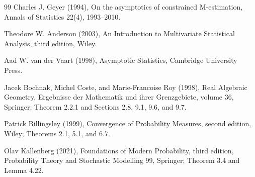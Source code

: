 \documentclass{article}
\begin{document}
\begin{thebibliography}{99}
   Charles J. Geyer (1994), On the asymptotics of constrained M-estimation, Annals of Statistics 22(4), 1993--2010.

   Theodore W. Anderson (2003), An Introduction to Multivariate Statistical Analysis, third edition, Wiley.

   Aad W. van der Vaart (1998), Asymptotic Statistics, Cambridge University Press.

   Jacek Bochnak, Michel Coste, and Marie-Francoise Roy (1998), Real Algebraic Geometry, Ergebnisse der Mathematik und ihrer Grenzgebiete, volume 36, Springer; Theorem 2.2.1 and Sections 2.8, 9.1, 9.6, and 9.7.

   Patrick Billingsley (1999), Convergence of Probability Measures, second edition, Wiley; Theorems 2.1, 5.1, and 6.7.

   Olav Kallenberg (2021), Foundations of Modern Probability, third edition, Probability Theory and Stochastic Modelling 99, Springer; Theorem 3.4 and Lemma 4.22.

\end{thebibliography}
\end{document}
